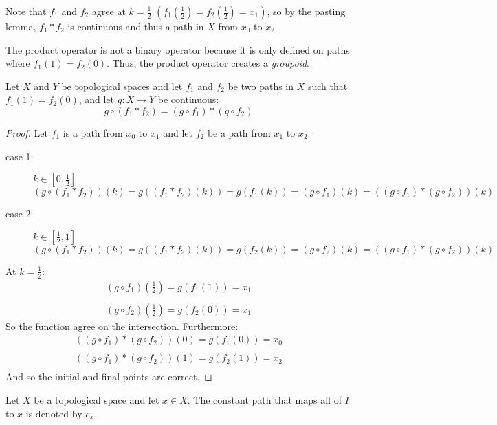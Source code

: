\documentclass[letterpaper,12pt,fleqn]{article}
\begin{document}
Note that \(f_1\) and \(f_2\) agree at \(k=\frac{1}{2}\)
\((f_1\left(\frac{1}{2}\right)=f_2\left(\frac{1}{2}\right)=x_1)\), so by the pasting lemma, \(f_1*f_2\) is
continuous and thus a path in \(X\) from \(x_0\) to \(x_2\).

The product operator is not a binary operator because it is only defined on paths where \(f_1(1)=f_2(0)\).  Thus,
the product operator creates a \emph{groupoid}.

\begin{lemma}
  Let \(X\) and \(Y\) be topological spaces and let \(f_1\) and \(f_2\) be two paths in \(X\) such that
  \(f_1(1)=f_2(0)\), and let \(g:X\to Y\) be continuous:
  \[g\circ(f_1*f_2)=(g\circ f_1)*(g\circ f_2)\]
\end{lemma}

\begin{proof}
  Let \(f_1\) is a path from \(x_0\) to \(x_1\) and let \(f_2\) be a path from \(x_1\) to \(x_2\).
  \begin{description}
  \item[case 1:] \(k\in\left[0,\frac{1}{2}\right]\)
    \[(g\circ(f_1*f_2))(k)=g((f_1*f_2)(k))=g(f_1(k))=(g\circ f_1)(k)=((g\circ f_1)*(g\circ f_2))(k)\]
  \item[case 2:] \(k\in\left[\frac{1}{2},1\right]\)
    \[(g\circ(f_1*f_2))(k)=g((f_1*f_2)(k))=g(f_2(k))=(g\circ f_2)(k)=((g\circ f_1)*(g\circ f_2))(k)\]
  \end{description}

  At \(k=\frac{1}{2}\):
  \begin{gather*}
    (g\circ f_1)\left(\frac{1}{2}\right)=g(f_1(1))=x_1 \\
    \\
    (g\circ f_2)\left(\frac{1}{2}\right)=g(f_2(0))=x_1
  \end{gather*}
  So the function agree on the intersection.  Furthermore:
  \begin{gather*}
    ((g\circ f_1)*(g\circ f_2))(0) = g(f_1(0))=x_0 \\
    \\
    ((g\circ f_1)*(g\circ f_2))(1) = g(f_2(1))=x_2 \\
  \end{gather*}
  And so the initial and final points are correct.
\end{proof}

\begin{notation}
  Let \(X\) be a topological space and let \(x\in X\).  The constant path that maps all of \(I\) to \(x\) is
  denoted by \(e_x\).
\end{notation}
\end{document}
